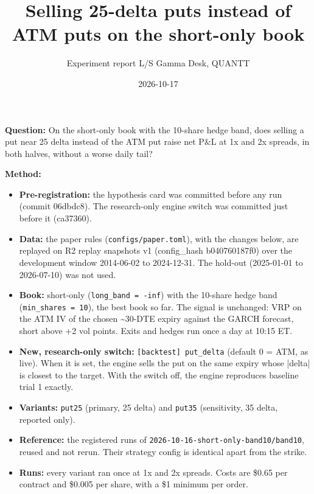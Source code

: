 \documentclass{article}
\title{Selling 25-delta puts instead of ATM puts on the short-only book}
\author{Experiment report \textperiodcentered{} L/S Gamma Desk, QUANTT}
\date{2026-10-17}
\begin{document}
\maketitle

\textbf{Question:} On the short-only book with the 10-share hedge band, does selling a put near 25 delta instead of the ATM put raise net P\&L at 1x and 2x spreads, in both halves, without a worse daily tail?

\textbf{Method:}

\begin{itemize}

\item \textbf{Pre-registration:} the hypothesis card was committed before any run (commit 06dbdc8). The research-only engine switch was committed just before it (ca37360).

\item \textbf{Data:} the paper rules (\texttt{configs/\allowbreak{}paper.\allowbreak{}toml}), with the changes below, are replayed on R2 replay snapshots v1 (config\_hash b040760187f0) over the development window 2014-06-02 to 2024-12-31. The hold-out (2025-01-01 to 2026-07-10) was not used.

\item \textbf{Book:} short-only (\texttt{long\_\allowbreak{}band = -\allowbreak{}inf}) with the 10-share hedge band (\texttt{min\_\allowbreak{}shares = 10}), the best book so far. The signal is unchanged: VRP on the ATM IV of the chosen \textasciitilde{}30-DTE expiry against the GARCH forecast, short above +2 vol points. Exits and hedges run once a day at 10:15 ET.

\item \textbf{New, research-only switch:} \texttt{[backtest] put\_\allowbreak{}delta} (default 0 = ATM, as live). When it is set, the engine sells the put on the same expiry whose |delta| is closest to the target. With the switch off, the engine reproduces baseline trial 1 exactly.

\item \textbf{Variants:} \texttt{put25} (primary, 25 delta) and \texttt{put35} (sensitivity, 35 delta, reported only).

\item \textbf{Reference:} the registered runs of \texttt{2026-\allowbreak{}10-\allowbreak{}16-\allowbreak{}short-\allowbreak{}only-\allowbreak{}band10/\allowbreak{}band10}, reused and not rerun. Their strategy config is identical apart from the strike.

\item \textbf{Runs:} every variant ran once at 1x and 2x spreads. Costs are \$0.65 per contract and \$0.005 per share, with a \$1 minimum per order.

\end{itemize}
\end{document}
